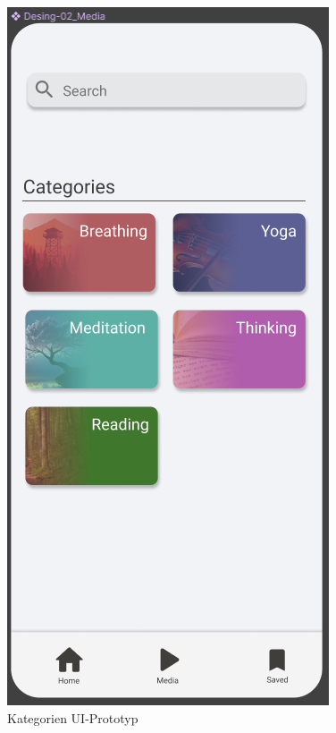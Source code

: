 \begin{figure}[H]
    \begin{minipage}{0.5\textwidth}
        \centering
        \includegraphics[height=2\textwidth]{./pics/pKategorien.png}
        \caption{Kategorien UI-Prototyp}

\end{minipage}
\end{figure}
